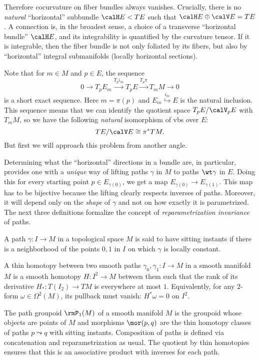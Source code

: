 Therefore cocurvature on fiber bundles always vanishes. Crucially, there is no \emph{natural} ``horizontal'' subbundle $\calH E<TE$ such that $\calH E\oplus \calV E=TE$. A connection is, in the broadest sense, a choice of a transverse ``horizontal bundle'' $\calH E$, and its integrability is quantified by the curvature tensor. If it is integrable, then the fiber bundle is not only foliated by its fibers, but also by ``horizontal''  integral submanifolds (locally horizontal sections).

Note that for $m\in M$ and $p\in E$, the sequence
\[0\to T_p E_m\overset{T_p i_m}{\to}T_p E\overset{T_p\pi}{\to}T_mM\to 0\]
is a short exact sequence. Here $m=\pi(p)$ and $E_m\overset{i_m}{\hookrightarrow} E$ is the natural inclusion. This sequence means that we can identify the quotient space $T_pE\slash \calV_pE$ with $T_mM$, so we have the following \emph{natural} isomorphism of \glspl{vb} over $E$:
\[TE\slash \calV E\cong \pi^\ast TM.\]
But first we will approach this problem from another angle.

Determining what the ``horizontal'' directions in a bundle are, in particular, provides one with a \emph{unique} way of lifting paths $\gamma$ in $M$ to paths $\wt\gamma$ in $E$. Doing this for every starting point $p\in E_{\gamma(0)}$, we get a map $E_{\gamma(0)}\to E_{\gamma(1)}$. This map has to be bijective because the lifting clearly respects inverses of paths. Moreover, it will depend only on the \emph{shape} of $\gamma$ and not on how exactly it is parametrized. The next three definitions formalize the concept of \emph{reparametrization invariance} of paths.

\begin{defn}
    A path $\gamma:I\to M$ in a topological space $M$ is said to have sitting instants if there is a neighborhood of the points $0,1$ in $I$ on which $\gamma$ is locally constant.
\end{defn}

\begin{defn}
    A thin homotopy between two smooth paths $\gamma_0,\gamma_1:I\to M$ in a smooth manifold $M$ is a smooth homotopy $H:I^2\to M$ between them such that the rank of its derivative $H_\ast:T(I_2)\to TM$ is everywhere at most $1$. Equivalently, for any $2$-form $\omega\in\Omega^2(M)$, its pullback must vanish: $H^\ast \omega=0$ on $I^2$.
\end{defn}

\begin{defn}
    The path groupoid $\rmP_1(M)$ of a smooth manifold $M$ is the groupoid whose objects are points of $M$ and morphisms $\mor(p,q)$ are the thin homotopy classes of paths $p\leadsto q$ with sitting instants. Composition of paths is defined via concatenation and reparametrization as usual. The quotient by thin homotopies ensures that this is an associative product with inverses for each path.
\end{defn}

